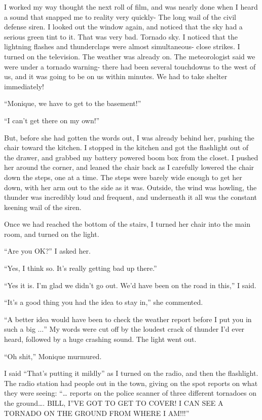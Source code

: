 I worked my way thought the next roll of film, and was nearly done when I heard a sound
that snapped me to reality very quickly- The long wail of the civil defense siren. I looked out
the window again, and noticed that the sky had a serious green tint to it. That was very bad.
Tornado sky. I noticed that the lightning flashes and thunderclaps were almost simultaneous-
close strikes. I turned on the television. The weather was already on. The meteorologist said we
were under a tornado warning- there had been several touchdowns to the west of us, and it was
going to be on us within minutes. We had to take shelter immediately!

``Monique, we have to get to the basement!''

``I can't get there on my own!''

But, before she had gotten the words out, I was already behind her, pushing the chair
toward the kitchen. I stopped in the kitchen and got the flashlight out of the drawer, and
grabbed my battery powered boom box from the closet. I pushed her around the corner, and leaned
the chair back as I carefully lowered the chair down the steps, one at a time. The steps were
barely wide enough to get her down, with her arm out to the side as it was. Outside, the wind
was howling, the thunder was incredibly loud and frequent, and underneath it all was the
constant keening wail of the siren.

Once we had reached the bottom of the stairs, I turned her chair into the main room, and
turned on the light.

``Are you OK?'' I asked her.

``Yes, I think so. It's really getting bad up there.''

``Yes it is. I'm glad we didn't go out. We'd have been on the road in this,'' I said.

``It's a good thing you had the idea to stay in,'' she commented.

``A better idea would have been to check the weather report before I put you in such a
big $\ldots$'' My words were cut off by the loudest crack of thunder I'd ever heard, followed
by a huge crashing sound. The light went out.

``Oh shit,'' Monique murmured.

I said ``That's putting it mildly'' as I turned on the radio, and then the flashlight. The
radio station had people out in the town, giving on the spot reports on what they were seeing:
``… reports on the police scanner of three different tornadoes on the ground…. BILL, I''VE GOT
TO GET TO COVER! I CAN SEE A TORNADO ON THE GROUND FROM WHERE I AM!!!''


